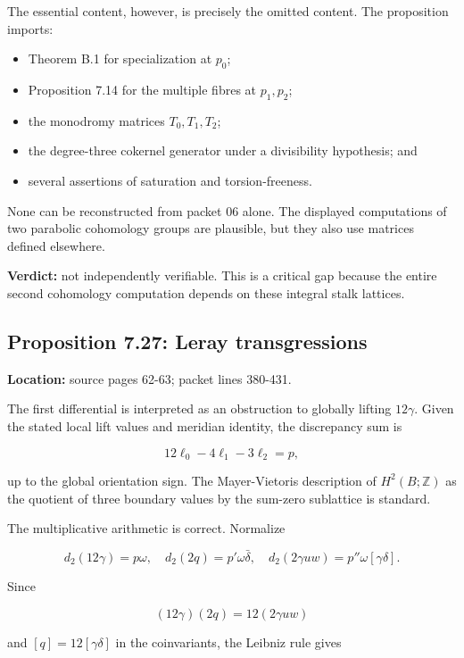 \documentclass[
  10pt,
]{article}
\providecommand{\tightlist}{%
  \setlength{\itemsep}{0pt}\setlength{\parskip}{0pt}}
\begin{document}
The essential content, however, is precisely the omitted content. The
proposition imports:

\begin{itemize}
\tightlist
\item
  Theorem B.1 for specialization at \(p_0\);
\item
  Proposition 7.14 for the multiple fibres at \(p_1,p_2\);
\item
  the monodromy matrices \(T_0,T_1,T_2\);
\item
  the degree-three cokernel generator under a divisibility hypothesis;
  and
\item
  several assertions of saturation and torsion-freeness.
\end{itemize}

None can be reconstructed from packet 06 alone. The displayed
computations of two parabolic cohomology groups are plausible, but they
also use matrices defined elsewhere.

\textbf{Verdict:} not independently verifiable. This is a critical gap
because the entire second cohomology computation depends on these
integral stalk lattices.

\subsection{Proposition 7.27: Leray
transgressions}\label{proposition-7.27-leray-transgressions}

\textbf{Location:} source pages 62-63; packet lines 380-431.

The first differential is interpreted as an obstruction to globally
lifting \(12\gamma\). Given the stated local lift values and meridian
identity, the discrepancy sum is

\[
12\ell_0-4\ell_1-3\ell_2=p,
\]

up to the global orientation sign. The Mayer-Vietoris description of
\(H^2(B;\mathbb Z)\) as the quotient of three boundary values by the
sum-zero sublattice is standard.

The multiplicative arithmetic is correct. Normalize

\[
d_2(12\gamma)=p\omega,
\quad d_2(2q)=p'\omega\bar\delta,
\quad d_2(2\gamma uw)=p''\omega[\gamma\delta].
\]

Since

\[
(12\gamma)(2q)=12(2\gamma uw)
\]

and \([q]=12[\gamma\delta]\) in the coinvariants, the Leibniz rule gives
\end{document}
